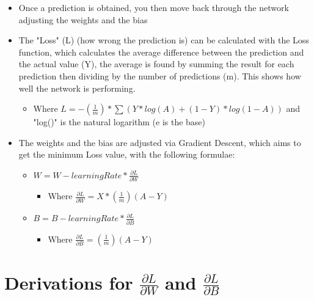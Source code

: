 \documentclass[10pt,a4paper]{article}
\begin{document}
\begin{itemize}
    \item Once a prediction is obtained, you then move back through the network adjusting the weights and the bias
    \item The "Loss" (L) (how wrong the prediction is) can be calculated with the Loss function, which calculates the average difference between the prediction and the actual value (Y), the average is found by summing the result for each prediction then dividing by the number of predictions (m). This shows how well the network is performing.
    \begin{itemize}
        \item Where $L = -(\frac{1}{m}) * \sum(Y * log(A) + (1-Y) * log(1-A))$ and "log()" is the natural logarithm (e is the base)
    \end{itemize}
    \item The weights and the bias are adjusted via Gradient Descent, which aims to get the minimum Loss value, with the following formulae:
    \begin{itemize}
        \item $W = W - learningRate * \frac{\partial{L}}{\partial{W}}$
        \begin{itemize}
            \item Where $\frac{\partial{L}}{\partial{W}} = X * (\frac{1}{m})(A-Y)$
        \end{itemize}
        \item $B = B - learningRate * \frac{\partial{L}}{\partial{B}}$
        \begin{itemize}
            \item Where $\frac{\partial{L}}{\partial{B}} = (\frac{1}{m})(A-Y)$
        \end{itemize}
    \end{itemize}
\end{itemize}

\section{Derivations for $\frac{\partial{L}}{\partial{W}}$ and $\frac{\partial{L}}{\partial{B}}$}
\end{document}

